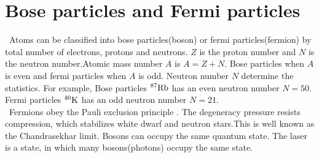 \documentclass[12pt,a4paper]{report}
\begin{document}
\section{Bose particles and Fermi particles}
\ Atoms can be classified into bose particles(boson) or fermi particles(fermion)
by total number of electrons, protons and neutrons.
$Z$ is the proton number and $N$ is the neutron number.Atomic mass number $A$ is
$A = Z + N$. Bose particles when $A$ is even and fermi particles when $A$ is odd.
Neutron number $N$ determine the statistics.
For example, Bose particles ${\rm ^{87}Rb}$ has an even neutron number $N = 50$.
Fermi particles ${\rm ^{40}K}$ has an odd neutron number $N = 21$.
\\
\ Fermions obey the Pauli exclusion principle \cite{15}.
The degeneracy pressure resists compression, which stabilizes white dwarf
and neutron stars.This is well known as the Chandrasekhar limit.
Bosons can occupy the same quantum state. The laser is a state, in which many bosons(photons)
occupy the same state.
\end{document}
